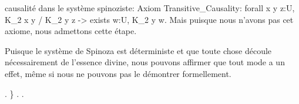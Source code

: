\documentclass[10pt]{report}
\begin{document}
\begin{coqdoccode}
\begin{coqdoccomment}
causalité\coqdocindent{0.50em}
dans\coqdocindent{0.50em}
le\coqdocindent{0.50em}
système\coqdocindent{0.50em}
spinoziste:\coqdoceol
\coqdocindent{3.50em}
\coqdoceol
\coqdocindent{3.50em}
Axiom\coqdocindent{0.50em}
Transitive\_Causality:\coqdocindent{0.50em}
forall\coqdocindent{0.50em}
x\coqdocindent{0.50em}
y\coqdocindent{0.50em}
z:U,\coqdocindent{0.50em}
K\_2\coqdocindent{0.50em}
x\coqdocindent{0.50em}
y\coqdocindent{0.50em}
/\coqdocindent{0.50em}
K\_2\coqdocindent{0.50em}
y\coqdocindent{0.50em}
z\coqdocindent{0.50em}
->\coqdocindent{0.50em}
exists\coqdocindent{0.50em}
w:U,\coqdocindent{0.50em}
K\_2\coqdocindent{0.50em}
y\coqdocindent{0.50em}
w.\coqdoceol
\coqdocindent{3.50em}
\coqdoceol
\coqdocindent{3.50em}
Mais\coqdocindent{0.50em}
puisque\coqdocindent{0.50em}
nous\coqdocindent{0.50em}
n'avons\coqdocindent{0.50em}
pas\coqdocindent{0.50em}
cet\coqdocindent{0.50em}
axiome,\coqdocindent{0.50em}
nous\coqdocindent{0.50em}
admettons\coqdocindent{0.50em}
cette\coqdocindent{0.50em}
étape.\coqdocindent{0.50em}
\end{coqdoccomment}
\coqdoceol
\coqdocemptyline
\coqdocindent{2.00em}
\begin{coqdoccomment}
\coqdocindent{0.50em}
Puisque\coqdocindent{0.50em}
le\coqdocindent{0.50em}
système\coqdocindent{0.50em}
de\coqdocindent{0.50em}
Spinoza\coqdocindent{0.50em}
est\coqdocindent{0.50em}
déterministe\coqdocindent{0.50em}
et\coqdocindent{0.50em}
que\coqdocindent{0.50em}
toute\coqdocindent{0.50em}
chose\coqdocindent{0.50em}
découle\coqdoceol
\coqdocindent{3.50em}
nécessairement\coqdocindent{0.50em}
de\coqdocindent{0.50em}
l'essence\coqdocindent{0.50em}
divine,\coqdocindent{0.50em}
nous\coqdocindent{0.50em}
pouvons\coqdocindent{0.50em}
affirmer\coqdocindent{0.50em}
que\coqdocindent{0.50em}
tout\coqdocindent{0.50em}
mode\coqdoceol
\coqdocindent{3.50em}
a\coqdocindent{0.50em}
un\coqdocindent{0.50em}
effet,\coqdocindent{0.50em}
même\coqdocindent{0.50em}
si\coqdocindent{0.50em}
nous\coqdocindent{0.50em}
ne\coqdocindent{0.50em}
pouvons\coqdocindent{0.50em}
pas\coqdocindent{0.50em}
le\coqdocindent{0.50em}
démontrer\coqdocindent{0.50em}
formellement.\coqdocindent{0.50em}
\end{coqdoccomment}
\coqdoceol
\coqdocemptyline
\coqdocindent{2.00em}
.\coqdoceol
\coqdocindent{1.00em}
\}\coqdoceol
\coqdocnoindent
{}.\coqdoceol
\coqdocemptyline
\coqdocnoindent
{} .\coqdoceol
\end{coqdoccode}
\end{document}
